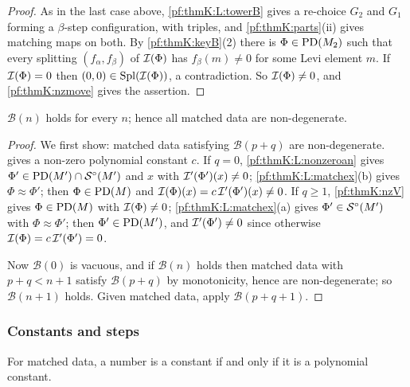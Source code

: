 \begin{proof}
As in the last case above, \ref{pf:thmK:L:towerB} gives a re-choice $G_2$ and $G_1$ forming a $\beta$-step configuration,
with triples, and \cref{pf:thmK:parts}(ii) gives matching maps on both. By \cref{pf:thmK:keyB}(2) there is
$\Phi\in\operatorname{PD}(M_2)$ such that every splitting $(f_\alpha,f_\beta)$ of $\mathcal{I}(\Phi)$ has $f_\beta(m)\ne0$ for some Levi
element $m$. If $\mathcal{I}(\Phi)=0$ then $(0,0)\in\operatorname{Spl}(\mathcal{I}(\Phi))$, a contradiction. So $\mathcal{I}(\Phi)\ne0$, and
\cref{pf:thmK:nzmove} gives the assertion.
\end{proof}

\begin{theorem}\label{pf:thmK:claim}
$\mathcal B(n)$ holds for every $n$; hence all matched data are non-degenerate.
\end{theorem}

\begin{proof}
We first show: matched data satisfying $\mathcal B(p+q)$ are non-degenerate.  gives a non-zero
polynomial constant $c$. If $q=0$, \ref{pf:thmK:L:nonzeroan} gives $\Phi'\in\operatorname{PD}(M')\cap\mathcal{S}^{\circ}(M')$ and $x$ with
$\mathcal{I}'(\Phi')(x)\ne0$; \ref{pf:thmK:L:matchex}(b) gives $\Phi\approx\Phi'$; then $\Phi\in\operatorname{PD}(M)$ and
$\mathcal{I}(\Phi)(x)=c\,\mathcal{I}'(\Phi')(x)\ne0$. If $q\ge1$, \cref{pf:thmK:nzV} gives $\Phi\in\operatorname{PD}(M)$ with $\mathcal{I}(\Phi)\ne0$;
\ref{pf:thmK:L:matchex}(a) gives $\Phi'\in\mathcal{S}^{\circ}(M')$ with $\Phi\approx\Phi'$; then $\Phi'\in\operatorname{PD}(M')$, and
$\mathcal{I}'(\Phi')\ne0$ since otherwise $\mathcal{I}(\Phi)=c\,\mathcal{I}'(\Phi')=0$.

Now $\mathcal B(0)$ is vacuous, and if $\mathcal B(n)$ holds then matched data with $p+q<n+1$ satisfy $\mathcal B(p+q)$ by
monotonicity, hence are non-degenerate; so $\mathcal B(n+1)$ holds. Given matched data, apply $\mathcal B(p+q+1)$.
\end{proof}

\subsubsection{Constants and steps}

\begin{lemma}\label{pf:thmK:polconst}
For matched data, a number is a constant if and only if it is a polynomial constant.
\end{lemma}

